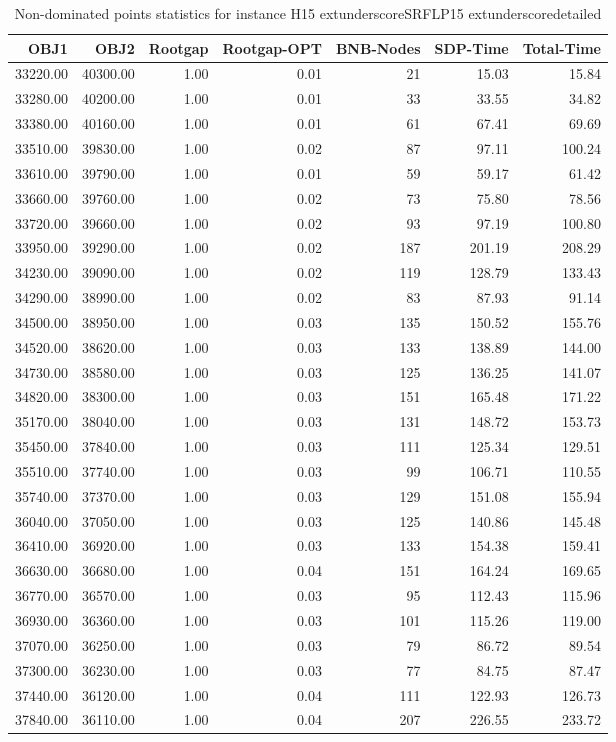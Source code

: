 \begin{table}
\caption{Non-dominated points statistics for instance H15	extunderscoreSRFLP15	extunderscoredetailed}
\label{tab:stats/H15_SRFLP15_detailed}
\begin{tabular}{rrrrrrr}
\toprule
OBJ1 & OBJ2 & Rootgap & Rootgap-OPT & BNB-Nodes & SDP-Time & Total-Time \\
\midrule
33220.00 & 40300.00 & 1.00 & 0.01 & 21 & 15.03 & 15.84 \\
33280.00 & 40200.00 & 1.00 & 0.01 & 33 & 33.55 & 34.82 \\
33380.00 & 40160.00 & 1.00 & 0.01 & 61 & 67.41 & 69.69 \\
33510.00 & 39830.00 & 1.00 & 0.02 & 87 & 97.11 & 100.24 \\
33610.00 & 39790.00 & 1.00 & 0.01 & 59 & 59.17 & 61.42 \\
33660.00 & 39760.00 & 1.00 & 0.02 & 73 & 75.80 & 78.56 \\
33720.00 & 39660.00 & 1.00 & 0.02 & 93 & 97.19 & 100.80 \\
33950.00 & 39290.00 & 1.00 & 0.02 & 187 & 201.19 & 208.29 \\
34230.00 & 39090.00 & 1.00 & 0.02 & 119 & 128.79 & 133.43 \\
34290.00 & 38990.00 & 1.00 & 0.02 & 83 & 87.93 & 91.14 \\
34500.00 & 38950.00 & 1.00 & 0.03 & 135 & 150.52 & 155.76 \\
34520.00 & 38620.00 & 1.00 & 0.03 & 133 & 138.89 & 144.00 \\
34730.00 & 38580.00 & 1.00 & 0.03 & 125 & 136.25 & 141.07 \\
34820.00 & 38300.00 & 1.00 & 0.03 & 151 & 165.48 & 171.22 \\
35170.00 & 38040.00 & 1.00 & 0.03 & 131 & 148.72 & 153.73 \\
35450.00 & 37840.00 & 1.00 & 0.03 & 111 & 125.34 & 129.51 \\
35510.00 & 37740.00 & 1.00 & 0.03 & 99 & 106.71 & 110.55 \\
35740.00 & 37370.00 & 1.00 & 0.03 & 129 & 151.08 & 155.94 \\
36040.00 & 37050.00 & 1.00 & 0.03 & 125 & 140.86 & 145.48 \\
36410.00 & 36920.00 & 1.00 & 0.03 & 133 & 154.38 & 159.41 \\
36630.00 & 36680.00 & 1.00 & 0.04 & 151 & 164.24 & 169.65 \\
36770.00 & 36570.00 & 1.00 & 0.03 & 95 & 112.43 & 115.96 \\
36930.00 & 36360.00 & 1.00 & 0.03 & 101 & 115.26 & 119.00 \\
37070.00 & 36250.00 & 1.00 & 0.03 & 79 & 86.72 & 89.54 \\
37300.00 & 36230.00 & 1.00 & 0.03 & 77 & 84.75 & 87.47 \\
37440.00 & 36120.00 & 1.00 & 0.04 & 111 & 122.93 & 126.73 \\
37840.00 & 36110.00 & 1.00 & 0.04 & 207 & 226.55 & 233.72 \\
\bottomrule
\end{tabular}
\end{table}
